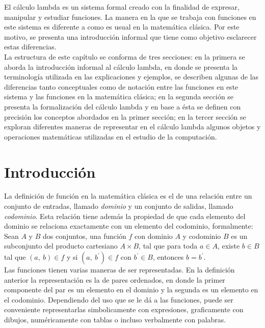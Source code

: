 El cálculo lambda es un sistema formal creado con la finalidad de expresar,
manipular y estudiar funciones. La manera en la que se trabaja con funciones en
este sistema es diferente a como es usual en la matemática clásica. Por este
motivo, se presenta una introducción informal que tiene como objetivo esclarecer
estas diferencias.\\

La estructura de este capítulo se conforma de tres secciones: en la primera se
aborda la introducción informal al cálculo lambda, en donde se presenta la
terminología utilizada en las explicaciones y ejemplos, se describen algunas de
las diferencias tanto conceptuales como de notación entre las funciones en este
sistema y las funciones en la matemática clásica; en la segunda sección se
presenta la formalización del cálculo lambda y en base a ésta se definen con
precisión los conceptos abordados en la primer sección; en la tercer sección se
exploran diferentes maneras de representar en el cálculo lambda algunos objetos
y operaciones matemáticas utilizadas en el estudio de la computación.\\

\section{Introducción} \label{sec:1.1}

La definición de función en la matemática clásica es el de una relación entre un
conjunto de entradas, llamado \emph{dominio} y un conjunto de salidas, llamado
\emph{codominio}. Esta relación tiene además la propiedad de que cada elemento
del dominio se relaciona exactamente con un elemento del codominio,
formalmente:\\

Sean \(A\) y \(B\) dos conjuntos, una función \(f\) con dominio \(A\) y
codominio \(B\) es un subconjunto del producto cartesiano \(A\times B\), tal que
para toda \(a\in A\), existe \(b\in B\) tal que \((a,\ b)\in f\) y si \((a,\
b^\prime)\in f\) con \(b^\prime \in B\), entonces \(b=b^\prime\).\\

Las funciones tienen varias maneras de ser representadas. En la definición
anterior la representación es la de pares ordenados, en donde la primer
componente del par es un elemento en el dominio y la segunda es un elemento en
el codominio. Dependiendo del uso que se le dá a las funciones,
puede ser conveniente representarlas simbolicamente con expresiones,
graficamente con dibujos, numéricamente con tablas o incluso verbalmente con
palabras.\\

